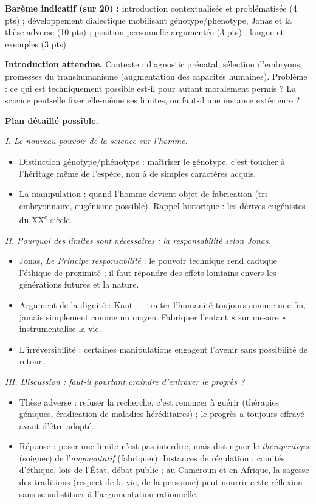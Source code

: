 \documentclass[11pt]{article}
\begin{document}
\begin{corrige}
\textbf{Barème indicatif (sur 20) :} introduction contextualisée et problématisée (4 pts) ; développement dialectique mobilisant génotype/phénotype, Jonas et la thèse adverse (10 pts) ; position personnelle argumentée (3 pts) ; langue et exemples (3 pts).

\textbf{Introduction attendue.} Contexte : diagnostic prénatal, sélection d'embryons, promesses du transhumanisme (augmentation des capacités humaines). Problème : ce qui est techniquement possible est-il pour autant moralement permis ? La science peut-elle fixer elle-même ses limites, ou faut-il une instance extérieure ?

\textbf{Plan détaillé possible.}

\emph{I. Le nouveau pouvoir de la science sur l'homme.}
\begin{itemize}
\item Distinction génotype/phénotype : maîtriser le génotype, c'est toucher à l'héritage même de l'espèce, non à de simples caractères acquis.
\item La manipulation : quand l'homme devient objet de fabrication (tri embryonnaire, eugénisme possible). Rappel historique : les dérives eugénistes du XX\textsuperscript{e} siècle.
\end{itemize}

\emph{II. Pourquoi des limites sont nécessaires : la responsabilité selon Jonas.}
\begin{itemize}
\item Jonas, \emph{Le Principe responsabilité} : le pouvoir technique rend caduque l'éthique de proximité ; il faut répondre des effets lointains envers les générations futures et la nature.
\item Argument de la dignité : Kant — traiter l'humanité toujours comme une fin, jamais simplement comme un moyen. Fabriquer l'enfant « sur mesure » instrumentalise la vie.
\item L'irréversibilité : certaines manipulations engagent l'avenir sans possibilité de retour.
\end{itemize}

\emph{III. Discussion : faut-il pourtant craindre d'entraver le progrès ?}
\begin{itemize}
\item Thèse adverse : refuser la recherche, c'est renoncer à guérir (thérapies géniques, éradication de maladies héréditaires) ; le progrès a toujours effrayé avant d'être adopté.
\item Réponse : poser une limite n'est pas interdire, mais distinguer le \emph{thérapeutique} (soigner) de l'\emph{augmentatif} (fabriquer). Instances de régulation : comités d'éthique, lois de l'État, débat public ; au Cameroun et en Afrique, la sagesse des traditions (respect de la vie, de la personne) peut nourrir cette réflexion sans se substituer à l'argumentation rationnelle.
\end{itemize}


\end{corrige}
\end{document}
